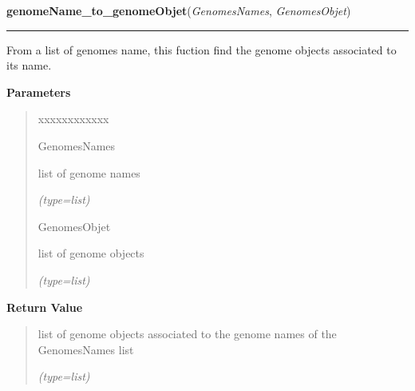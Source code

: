 \hspace{.8\funcindent}\begin{boxedminipage}{\funcwidth}

    \raggedright \textbf{genomeName\_to\_genomeObjet}(\textit{GenomesNames}, \textit{GenomesObjet})

    \vspace{-1.5ex}

    \rule{\textwidth}{0.5\fboxrule}
\setlength{\parskip}{2ex}
    From a list of genomes name, this fuction find the genome objects 
    associated to its name.

\setlength{\parskip}{1ex}
      \textbf{Parameters}
      \vspace{-1ex}

      \begin{quote}
        \begin{Ventry}{xxxxxxxxxxxx}

          \item[GenomesNames]

          list of genome names

            {\it (type=list)}

          \item[GenomesObjet]

          list of genome objects

            {\it (type=list)}

        \end{Ventry}

      \end{quote}

      \textbf{Return Value}
    \vspace{-1ex}

      \begin{quote}
      list of genome objects associated to the genome names of the 
      GenomesNames list

      {\it (type=list)}

      \end{quote}

    \end{boxedminipage}

    \label{script-phyloFixedVar:createDicoPos}

    \vspace{0.5ex}

